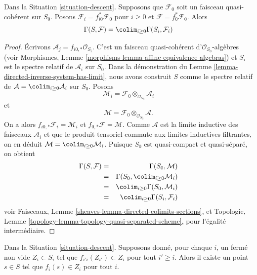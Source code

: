 \begin{lemma}
\label{lemma-descend-section}
Dans la Situation \ref{situation-descent}. Supposons que $\mathcal{F}_0$
soit un faisceau quasi-cohérent sur $S_0$. Posons
$\mathcal{F}_i = f_{i0}^*\mathcal{F}_0$ pour $i \geq 0$ et
$\mathcal{F} = f_0^*\mathcal{F}_0$. Alors
$$
\Gamma(S, \mathcal{F}) = \colim_{i \geq 0} \Gamma(S_i, \mathcal{F}_i)
$$
\end{lemma}

\begin{proof}
Écrivons $\mathcal{A}_j = f_{i0, *} \mathcal{O}_{S_i}$. C'est un faisceau
quasi-cohérent d'$\mathcal{O}_{S_0}$-algèbres (voir Morphismes,
Lemme \ref{morphisms-lemma-affine-equivalence-algebras}) et $S_i$ est le
spectre relatif de $\mathcal{A}_i$ sur $S_0$. Dans la démonstration du
Lemme \ref{lemma-directed-inverse-system-has-limit}, nous avons construit
$S$ comme le spectre relatif de
$\mathcal{A} = \colim_{i \geq 0} \mathcal{A}_i$ sur $S_0$. Posons
$$
\mathcal{M}_i = \mathcal{F}_0 \otimes_{\mathcal{O}_{S_0}} \mathcal{A}_i
$$
et
$$
\mathcal{M} = \mathcal{F}_0 \otimes_{\mathcal{O}_{S_0}} \mathcal{A}.
$$
On a alors $f_{i0, *} \mathcal{F}_i = \mathcal{M}_i$ et
$f_{0, *}\mathcal{F} = \mathcal{M}$. Comme $\mathcal{A}$ est la limite
inductive des faisceaux $\mathcal{A}_i$ et que le produit tensoriel commute
aux limites inductives filtrantes, on en déduit
$\mathcal{M} = \colim_{i \geq 0} \mathcal{M}_i$. Puisque $S_0$ est
quasi-compact et quasi-séparé, on obtient
\begin{eqnarray*}
\Gamma(S, \mathcal{F})
& = &
\Gamma(S_0, \mathcal{M}) \\
& = &
\Gamma(S_0, \colim_{i \geq 0} \mathcal{M}_i) \\
& = &
\colim_{i \geq 0} \Gamma(S_0, \mathcal{M}_i) \\
& = &
\colim_{i \geq 0} \Gamma(S_i, \mathcal{F}_i)
\end{eqnarray*}
voir Faisceaux, Lemme \ref{sheaves-lemma-directed-colimits-sections}, et
Topologie, Lemme \ref{topology-lemma-topology-quasi-separated-scheme}, pour
l'égalité intermédiaire.
\end{proof}

\begin{lemma}
\label{lemma-limit-closed-nonempty}
Dans la Situation \ref{situation-descent}. Supposons donné, pour chaque $i$,
un fermé non vide $Z_i \subset S_i$ tel que
$f_{i'i}(Z_{i'}) \subset Z_i$ pour tout $i' \geq i$. Alors il existe un
point $s \in S$ tel que $f_i(s) \in Z_i$ pour tout $i$.
\end{lemma}

